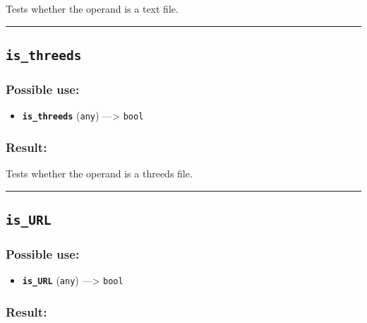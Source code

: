\documentclass[]{book}
\providecommand{\tightlist}{%
  \setlength{\itemsep}{0pt}\setlength{\parskip}{0pt}}
\theoremstyle{definition}
\theoremstyle{definition}
\theoremstyle{definition}
\theoremstyle{remark}
\begin{document}
Tests whether the operand is a text file.

\begin{center}\rule{0.5\linewidth}{\linethickness}\end{center}

\subsection{\texorpdfstring{\texttt{is\_threeds}}{is\_threeds}}\label{is_threeds}

\subsubsection{Possible use:}\label{possible-use-306}

\begin{itemize}
\tightlist
\item
  \textbf{\texttt{is\_threeds}} (\texttt{any}) ---\textgreater{}
  \texttt{bool}
\end{itemize}

\subsubsection{Result:}\label{result-296}

Tests whether the operand is a threeds file.

\begin{center}\rule{0.5\linewidth}{\linethickness}\end{center}

\subsection{\texorpdfstring{\texttt{is\_URL}}{is\_URL}}\label{is_url}

\subsubsection{Possible use:}\label{possible-use-307}

\begin{itemize}
\tightlist
\item
  \textbf{\texttt{is\_URL}} (\texttt{any}) ---\textgreater{}
  \texttt{bool}
\end{itemize}

\subsubsection{Result:}\label{result-297}
\end{document}
